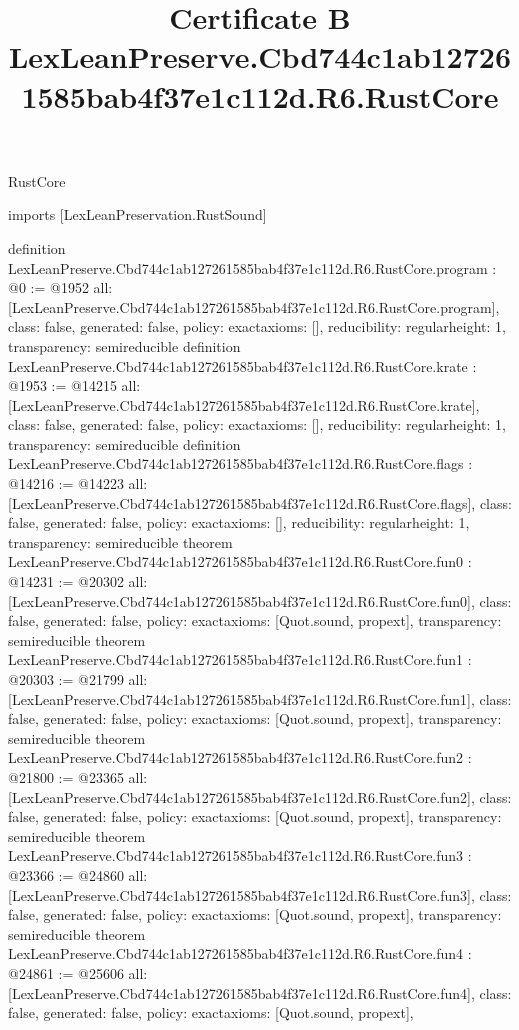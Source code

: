 \begin{lexlean}{RustCore}
\title{Certificate B LexLeanPreserve.Cbd744c1ab127261585bab4f37e1c112d.R6.RustCore}
\begin{coremodule}
imports [LexLeanPreservation.RustSound]

definition LexLeanPreserve.Cbd744c1ab127261585bab4f37e1c112d.R6.RustCore.program : @0 := @1952 {
  all: [LexLeanPreserve.Cbd744c1ab127261585bab4f37e1c112d.R6.RustCore.program],
  class: false,
  generated: false,
  policy: exact{axioms: []},
  reducibility: regular{height: 1},
  transparency: semireducible
}
definition LexLeanPreserve.Cbd744c1ab127261585bab4f37e1c112d.R6.RustCore.krate : @1953 := @14215 {
  all: [LexLeanPreserve.Cbd744c1ab127261585bab4f37e1c112d.R6.RustCore.krate],
  class: false,
  generated: false,
  policy: exact{axioms: []},
  reducibility: regular{height: 1},
  transparency: semireducible
}
definition LexLeanPreserve.Cbd744c1ab127261585bab4f37e1c112d.R6.RustCore.flags : @14216 := @14223 {
  all: [LexLeanPreserve.Cbd744c1ab127261585bab4f37e1c112d.R6.RustCore.flags],
  class: false,
  generated: false,
  policy: exact{axioms: []},
  reducibility: regular{height: 1},
  transparency: semireducible
}
theorem LexLeanPreserve.Cbd744c1ab127261585bab4f37e1c112d.R6.RustCore.fun0 : @14231 := @20302 {
  all: [LexLeanPreserve.Cbd744c1ab127261585bab4f37e1c112d.R6.RustCore.fun0],
  class: false,
  generated: false,
  policy: exact{axioms: [Quot.sound, propext]},
  transparency: semireducible
}
theorem LexLeanPreserve.Cbd744c1ab127261585bab4f37e1c112d.R6.RustCore.fun1 : @20303 := @21799 {
  all: [LexLeanPreserve.Cbd744c1ab127261585bab4f37e1c112d.R6.RustCore.fun1],
  class: false,
  generated: false,
  policy: exact{axioms: [Quot.sound, propext]},
  transparency: semireducible
}
theorem LexLeanPreserve.Cbd744c1ab127261585bab4f37e1c112d.R6.RustCore.fun2 : @21800 := @23365 {
  all: [LexLeanPreserve.Cbd744c1ab127261585bab4f37e1c112d.R6.RustCore.fun2],
  class: false,
  generated: false,
  policy: exact{axioms: [Quot.sound, propext]},
  transparency: semireducible
}
theorem LexLeanPreserve.Cbd744c1ab127261585bab4f37e1c112d.R6.RustCore.fun3 : @23366 := @24860 {
  all: [LexLeanPreserve.Cbd744c1ab127261585bab4f37e1c112d.R6.RustCore.fun3],
  class: false,
  generated: false,
  policy: exact{axioms: [Quot.sound, propext]},
  transparency: semireducible
}
theorem LexLeanPreserve.Cbd744c1ab127261585bab4f37e1c112d.R6.RustCore.fun4 : @24861 := @25606 {
  all: [LexLeanPreserve.Cbd744c1ab127261585bab4f37e1c112d.R6.RustCore.fun4],
  class: false,
  generated: false,
  policy: exact{axioms: [Quot.sound, propext]},
}
\end{coremodule}
\end{lexlean}
